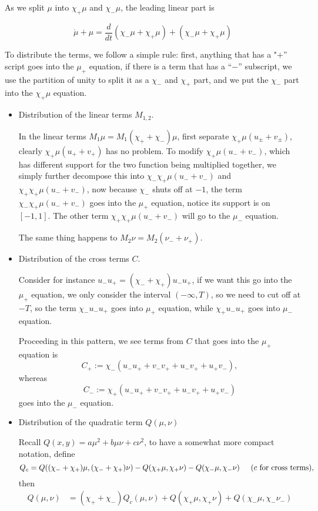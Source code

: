 \documentclass[letterpaper,11pt]{article}
\numberwithin{equation}{section}
\theoremstyle{plain}
\begin{document}
As we split $\mu$ into $\chi_+\mu$ and $\chi_-\mu$, the leading linear part is

\[
\dot{\mu}+\mu = \frac{d}{dt}(\chi_-\mu+\chi_+\mu)+(\chi_-\mu+\chi_+\mu)
\]

To distribute the terms, we follow a simple rule: first, anything that has a "$+$'' script goes into the $\mu_+$ equation, if there is a term  that has a ``$-$'' subscript, we use the partition of unity to split it as a $\chi_-$ and $\chi_+$ part, and we put the $\chi_-$ part into the $\chi_+\mu$ equation. 

\begin{itemize}
\item Distribution of the linear terms $M_{1,2}$.

In the linear terms $M_1 \mu = M_1 (\chi_++\chi_-)\mu  $, first separate $\chi_+\mu(u_{\pm}+v_{\pm})$, clearly $\chi_+\mu(u_+ + v_+)$ has no problem. To modify $\chi_+\mu(u_-+v_-)$, which has different support for the two function being multiplied together, we simply further decompose this into $\chi_-\chi_+\mu(u_-+v_-)$ and $\chi_+\chi_+\mu(u_-+v_-)$, now because $\chi_-$ shuts off at $-1$, the term $\chi_- \chi_+\mu(u_-+v_-)$ goes into the $\mu_+$ equation, notice its support is on $[-1,1]$. The other term $\chi_+\chi_+\mu(u_-+v_-)$ will go to the $\mu_-$ equation.

The same thing happens to $M_2\nu = M_2(\nu_-+\nu_+)$.

\item Distribution of the cross terms $C$.

Consider for instance $u_-u_+ = (\chi_-+\chi_+)u_-u_+$, if we want this go into the $\mu_+$ equation, we only consider the interval $(-\infty,T)$, so we need to cut off at $-T$, so the term $\chi_- u_-u_+$ goes into $\mu_+$ equation, while $\chi_+u_-u_+$ goes into $\mu_-$ equation.

Proceeding in this pattern, we see terms from $C$ that goes into the $\mu_+$ equation is
\[
C_+:=\chi_-(u_-u_++v_-v_++u_-v_++u_+v_-),
\]
whereas
\[
C_-:=\chi_+(u_-u_++v_-v_++u_-v_++u_+v_-)
\]
goes into the $\mu_-$ equation.

\item Distribution of the quadratic term $Q(\mu,\nu)$

Recall $Q(x,y)=a\mu^2+b\mu\nu+c\nu^2$, to have a somewhat more compact notation, define 
\[
Q_c = Q((\chi_-+\chi_+)\mu,(\chi_-+\chi_+)\nu)-Q(\chi_+\mu,\chi_+\nu)-Q(\chi_-\mu,\chi_-\nu) \hspace{0.2in} \text{($c$ for cross terms),}
\]
 then
\begin{align*}
Q(\mu,\nu) &=(\chi_++\chi_-)Q_c(\mu,\nu)+Q(\chi_+\mu,\chi_+\nu)+Q(\chi_-\mu,\chi_-\nu_-)
\end{align*}


\end{itemize}
\end{document}
